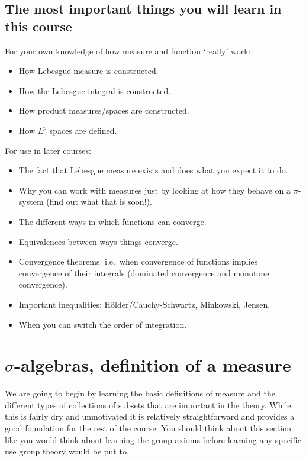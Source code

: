 \documentclass[
]{book}
\providecommand{\tightlist}{%
  \setlength{\itemsep}{0pt}\setlength{\parskip}{0pt}}
\theoremstyle{definition}
\theoremstyle{definition}
\theoremstyle{definition}
\theoremstyle{definition}
\theoremstyle{remark}
\begin{document}
\hypertarget{the-most-important-things-you-will-learn-in-this-course}{%
\section{The most important things you will learn in this course}\label{the-most-important-things-you-will-learn-in-this-course}}

For your own knowledge of how measure and function `really' work:

\begin{itemize}
\tightlist
\item
  How Lebesgue measure is constructed.
\item
  How the Lebesgue integral is constructed.
\item
  How product measures/spaces are constructed.
\item
  How \(L^p\) spaces are defined.
\end{itemize}

For use in later courses:

\begin{itemize}
\tightlist
\item
  The fact that Lebesgue measure exists and does what you expect it to do.
\item
  Why you can work with measures just by looking at how they behave on a \(\pi\)-system (find out what that is soon!).
\item
  The different ways in which functions can converge.
\item
  Equivalences between ways things converge.
\item
  Convergence theorems: i.e.~when convergence of functions implies convergence of their integrals (dominated convergence and monotone convergence).
\item
  Important inequalities: Hölder/Cauchy-Schwartz, Minkowski, Jensen.
\item
  When you can switch the order of integration.
\end{itemize}

\hypertarget{sigma-algebras-definition-of-a-measure}{%
\chapter{\texorpdfstring{\(\sigma\)-algebras, definition of a measure}{\textbackslash sigma-algebras, definition of a measure}}\label{sigma-algebras-definition-of-a-measure}}

We are going to begin by learning the basic definitions of measure and the different types of collections of subsets that are important in the theory. While this is fairly dry and unmotivated it is relatively straightforward and provides a good foundation for the rest of the course. You should think about this section like you would think about learning the group axioms before learning any specific use group theory would be put to.
\end{document}
